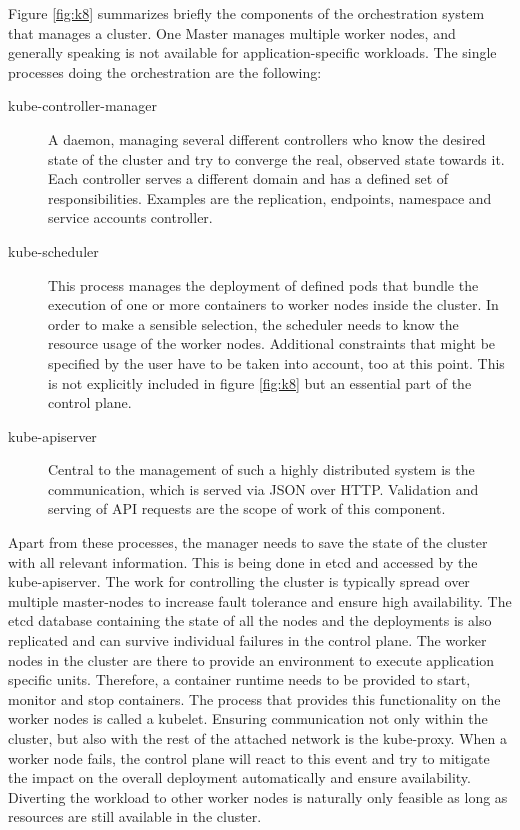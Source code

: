 Figure \ref{fig:k8} summarizes briefly the components of the orchestration system that manages a cluster. One Master manages multiple worker nodes, and generally speaking is not available for application-specific workloads. The single processes doing the orchestration are the following:

\setlength{\leftmargini}{0pt} 
\begin{description}
	\item [kube-controller-manager] A daemon, managing several different controllers who know the desired state of the cluster and try to converge the real, observed state towards it. Each controller serves a different domain and has a defined set of responsibilities. Examples are the replication, endpoints, namespace and service accounts controller.
	
	\item [kube-scheduler] This process manages the deployment of defined pods that bundle the execution of one or more containers to worker nodes inside the cluster. In order to make a sensible selection, the scheduler needs to know the resource usage of the worker nodes. Additional constraints that might be specified by the user have to be taken into account, too at this point. This is not explicitly included in figure \ref{fig:k8} but an essential part of the control plane.
	
	\item [kube-apiserver] Central to the management of such a highly distributed system is the communication, which is served via JSON over HTTP. Validation and serving of API requests are the scope of work of this component. 
\end{description}

Apart from these processes, the manager needs to save the state of the cluster with all relevant information. This is being done in etcd and accessed by the kube-apiserver. The work for controlling the cluster is typically spread over multiple master-nodes to increase fault tolerance and ensure high availability. The etcd database containing the state of all the nodes and the deployments is also replicated and can survive individual failures in the control plane. 
The worker nodes in the cluster are there to provide an environment to execute application specific units. Therefore, a container runtime needs to be provided to start, monitor and stop containers. The process that provides this functionality on the worker nodes is called a kubelet. Ensuring communication not only within the cluster, but also with the rest of the attached network is the kube-proxy. When a worker node fails, the control plane will react to this event and try to mitigate the impact on the overall deployment automatically and ensure availability. Diverting the workload to other worker nodes is naturally only feasible as long as resources are still available in the cluster.

